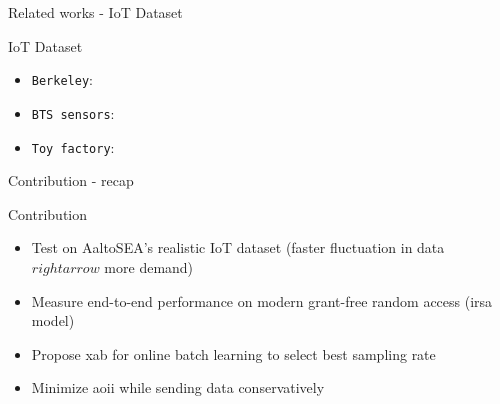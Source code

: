 \documentclass[9pt]{beamer}
\begin{document}
\begin{frame}{Related works - IoT Dataset}
    \begin{block}{IoT Dataset}
        \begin{itemize}
            \item \texttt{Berkeley}: 
            \item \texttt{BTS sensors}: 
            \item \texttt{Toy factory}: 
        \end{itemize}
    \end{block}
\end{frame}

\begin{frame}{Contribution - recap}
    \begin{block}{Contribution}
        \begin{itemize}
            \item Test on AaltoSEA's \alert{realistic IoT dataset} (faster fluctuation in data $rightarrow$ more demand)
            \item Measure \alert{end-to-end performance} on modern grant-free random access (\gls{irsa} model)
            \item Propose \gls{xab} for \alert{online batch learning} to select best sampling rate
            \item Minimize \alert{\gls{aoii}} while sending data \alert{conservatively}
        \end{itemize}
    \end{block}
\end{frame}
\end{document}
